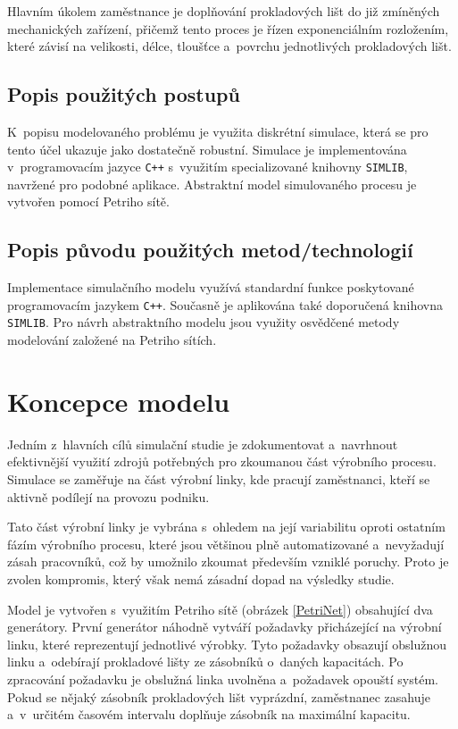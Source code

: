 \documentclass[a4paper, 11pt]{article}
\begin{document}
Hlavním úkolem zaměstnance je doplňování prokladových lišt do již zmíněných mechanických zařízení, přičemž tento proces je řízen exponenciálním rozložením, které závisí na velikosti, délce, tloušťce a~povrchu jednotlivých prokladových lišt.

\subsection{Popis použitých postupů}

K~popisu modelovaného problému je využita diskrétní simulace, která se pro tento účel ukazuje jako dostatečně robustní.
Simulace je implementována v~programovacím jazyce \texttt{C++} s~využitím specializované knihovny \texttt{SIMLIB}, navržené pro podobné aplikace.
Abstraktní model simulovaného procesu je vytvořen pomocí Petriho sítě.

\subsection{Popis původu použitých metod/technologií}

Implementace simulačního modelu využívá standardní funkce poskytované programovacím jazykem \texttt{C++}.
Současně je aplikována také doporučená knihovna \texttt{SIMLIB}.
Pro návrh abstraktního modelu jsou využity osvědčené metody modelování založené na Petriho sítích.

\newpage

\section{Koncepce modelu}

Jedním z~hlavních cílů simulační studie je zdokumentovat a~navrhnout efektivnější využití zdrojů potřebných pro zkoumanou část výrobního procesu.
Simulace se zaměřuje na část výrobní linky, kde pracují zaměstnanci, kteří se aktivně podílejí na provozu podniku.

Tato část výrobní linky je vybrána s~ohledem na její variabilitu oproti ostatním fázím výrobního procesu, které jsou většinou plně automatizované a~nevyžadují zásah pracovníků, což by umožnilo zkoumat především vzniklé poruchy.
Proto je zvolen kompromis, který však nemá zásadní dopad na výsledky studie.

Model je vytvořen s~využitím Petriho sítě (obrázek \ref{PetriNet}) obsahující dva generátory.
První generátor náhodně vytváří požadavky přicházející na výrobní linku, které reprezentují jednotlivé výrobky.
Tyto požadavky obsazují obslužnou linku a~odebírají prokladové lišty ze zásobníků o~daných kapacitách.
Po zpracování požadavku je obslužná linka uvolněna a~požadavek opouští systém.
Pokud se nějaký zásobník prokladových lišt vyprázdní, zaměstnanec zasahuje a~v~určitém časovém intervalu doplňuje zásobník na maximální kapacitu.
\end{document}
